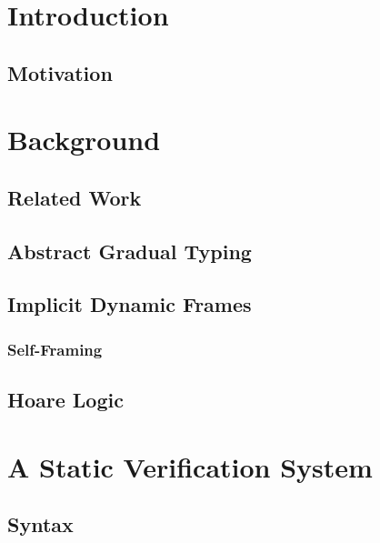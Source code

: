 
\chapter{Introduction}

\section{Motivation}

\chapter{Background}

\section{Related Work}

\section{Abstract Gradual Typing}

\section{Implicit Dynamic Frames}

\subsection{Self-Framing}

\section{Hoare Logic}

\chapter{A Static Verification System}

\section{Syntax}

